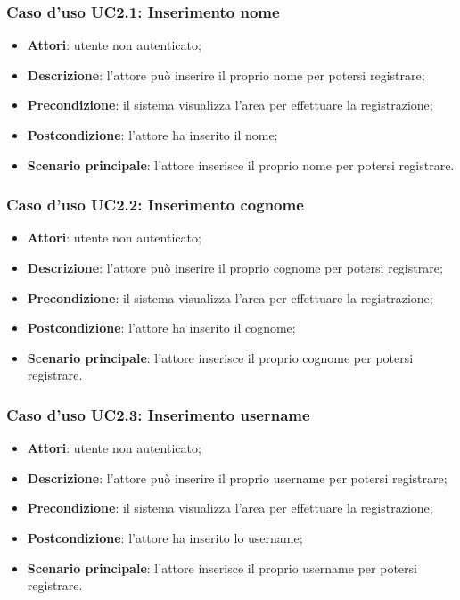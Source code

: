 \subsubsection{Caso d'uso UC2.1: Inserimento nome}
\begin{itemize}
\item \textbf{Attori}: utente non autenticato;
\item \textbf{Descrizione}: l'attore può inserire il proprio nome per potersi registrare;
\item \textbf{Precondizione}: il sistema visualizza l'area per effettuare la registrazione;
\item \textbf{Postcondizione}: l'attore ha inserito il nome;
\item \textbf{Scenario principale}: l'attore inserisce il proprio nome per potersi registrare.
\end{itemize}

\subsubsection{Caso d'uso UC2.2: Inserimento cognome}
\begin{itemize}
\item \textbf{Attori}: utente non autenticato;
\item \textbf{Descrizione}: l'attore può inserire il proprio cognome per potersi registrare;
\item \textbf{Precondizione}: il sistema visualizza l'area per effettuare la registrazione;
\item \textbf{Postcondizione}: l'attore ha inserito il cognome;
\item \textbf{Scenario principale}: l'attore inserisce il proprio cognome per potersi registrare.
\end{itemize}

\subsubsection{Caso d'uso UC2.3: Inserimento username}
\begin{itemize}
\item \textbf{Attori}: utente non autenticato;
\item \textbf{Descrizione}: l'attore può inserire il proprio username per potersi registrare;
\item \textbf{Precondizione}: il sistema visualizza l'area per effettuare la registrazione;
\item \textbf{Postcondizione}: l'attore ha inserito lo username;
\item \textbf{Scenario principale}: l'attore inserisce il proprio username per potersi registrare.
\end{itemize}

